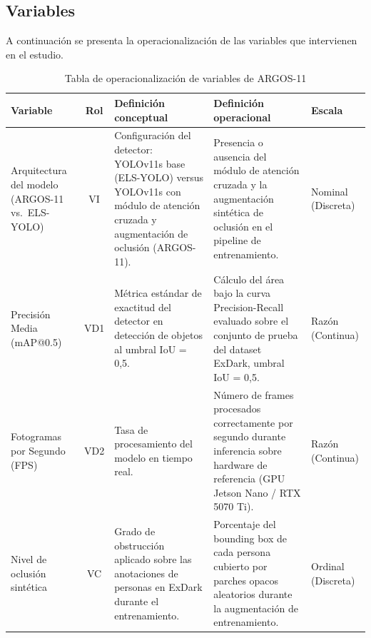 \subsection{Variables}

A continuaci\'on se presenta la operacionalizaci\'on de las
variables que intervienen en el estudio.

\bigskip

\begin{table}[h!]
\centering
\caption{Tabla de operacionalizaci\'on de variables de ARGOS-11}
\label{tab:variables}
\renewcommand{\arraystretch}{1.4}
\begin{tabular}{|p{3cm}|c|p{3.3cm}|p{3.3cm}|p{1.6cm}|}
\hline
\textbf{Variable} & \textbf{Rol} &
\textbf{Definici\'on conceptual} &
\textbf{Definici\'on operacional} & \textbf{Escala} \\
\hline
Arquitectura del modelo (ARGOS-11 vs.\ ELS-YOLO) &
VI &
Configuraci\'on del detector: YOLOv11s base (ELS-YOLO) versus
YOLOv11s con m\'odulo de atenci\'on cruzada y augmentaci\'on de
oclusi\'on (ARGOS-11). &
Presencia o ausencia del m\'odulo de atenci\'on cruzada y la
augmentaci\'on sint\'etica de oclusi\'on en el pipeline de
entrenamiento. &
Nominal (Discreta) \\
\hline
Precisi\'on Media (mAP@0.5) &
VD1 &
M\'etrica est\'andar de exactitud del detector en detecci\'on de
objetos al umbral IoU = 0{,}5. &
C\'alculo del \'area bajo la curva Precision-Recall evaluado sobre
el conjunto de prueba del dataset ExDark, umbral IoU = 0{,}5. &
Raz\'on (Continua) \\
\hline
Fotogramas por Segundo (FPS) &
VD2 &
Tasa de procesamiento del modelo en tiempo real. &
N\'umero de frames procesados correctamente por segundo durante
inferencia sobre hardware de referencia (GPU Jetson Nano /
RTX 5070 Ti). &
Raz\'on (Continua) \\
\hline
Nivel de oclusi\'on sint\'etica &
VC &
Grado de obstrucci\'on aplicado sobre las anotaciones de personas
en ExDark durante el entrenamiento. &
Porcentaje del bounding box de cada persona cubierto por parches
opacos aleatorios durante la augmentaci\'on de entrenamiento. &
Ordinal (Discreta) \\
\hline
\end{tabular}
\end{table}

\bigskip
\newpage

